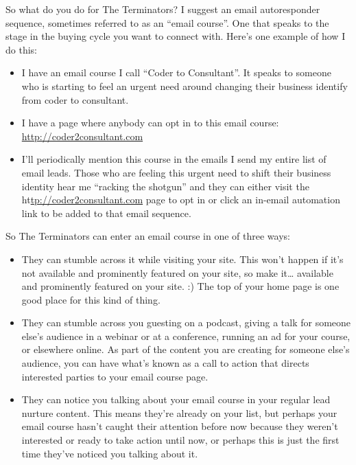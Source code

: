 So what do you do for The Terminators? I suggest an email autoresponder sequence, sometimes referred to as an ``email course''. One that speaks to the stage in the buying cycle you want to connect with. Here's one example of how I do this:

\begin{itemize}
\item I have an email course I call ``Coder to Consultant''. It speaks to someone who is starting to feel an urgent need around changing their business identify from coder to consultant.
\item I have a page where anybody can opt in to this email course: \href{http://coder2consultant.com}{http://coder2consultant.com}
\item I'll periodically mention this course in the emails I send my entire list of email leads. Those who are feeling this urgent need to shift their business identity hear me ``racking the shotgun'' and they can either visit the ht\href{tp://coder2consultant.com}{tp://coder2consultant.com} page to opt in or click an in-email automation link to be added to that email sequence.
\end{itemize}

So The Terminators can enter an email course in one of three ways:

\begin{itemize}
\item They can stumble across it while visiting your site. This won't happen if it's not available and prominently featured on your site, so make it\ldots{} available and prominently featured on your site. :) The top of your home page is one good place for this kind of thing.
\item They can stumble across you guesting on a podcast, giving a talk for someone else's audience in a webinar or at a conference, running an ad for your course, or elsewhere online. As part of the content you are creating for someone else's audience, you can have what's known as a call to action that directs interested parties to your email course page.
\item They can notice you talking about your email course in your regular lead nurture content. This means they're already on your list, but perhaps your email course hasn't caught their attention before now because they weren't interested or ready to take action until now, or perhaps this is just the first time they've noticed you talking about it.
\end{itemize}


